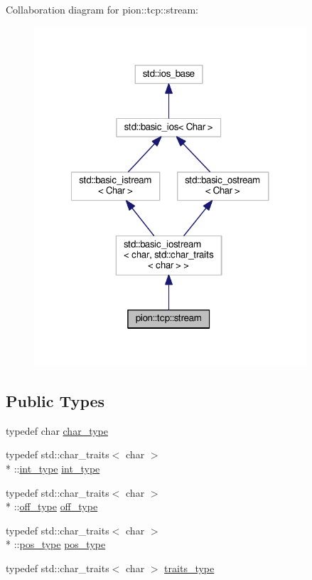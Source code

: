 Collaboration diagram for pion\-:\-:tcp\-:\-:stream\-:
\nopagebreak
\begin{figure}[H]
\begin{center}
\leavevmode
\includegraphics[width=287pt]{classpion_1_1tcp_1_1stream__coll__graph}
\end{center}
\end{figure}
\subsection*{Public Types}
\begin{DoxyCompactItemize}
\item 
typedef char \hyperlink{classpion_1_1tcp_1_1stream_a7a1f84f71957c4d181b3956544bed706}{char\-\_\-type}
\item 
typedef std\-::char\-\_\-traits$<$ char $>$\\*
\-::\hyperlink{classpion_1_1tcp_1_1stream_a226831f2baafb1ad65259fc6c9bb511a}{int\-\_\-type} \hyperlink{classpion_1_1tcp_1_1stream_a226831f2baafb1ad65259fc6c9bb511a}{int\-\_\-type}
\item 
typedef std\-::char\-\_\-traits$<$ char $>$\\*
\-::\hyperlink{classpion_1_1tcp_1_1stream_a035e53a0425f0f05a3c3fd6c9c8be55d}{off\-\_\-type} \hyperlink{classpion_1_1tcp_1_1stream_a035e53a0425f0f05a3c3fd6c9c8be55d}{off\-\_\-type}
\item 
typedef std\-::char\-\_\-traits$<$ char $>$\\*
\-::\hyperlink{classpion_1_1tcp_1_1stream_a9a325595e421119b0e6e6b5972863d98}{pos\-\_\-type} \hyperlink{classpion_1_1tcp_1_1stream_a9a325595e421119b0e6e6b5972863d98}{pos\-\_\-type}
\item 
typedef std\-::char\-\_\-traits$<$ char $>$ \hyperlink{classpion_1_1tcp_1_1stream_a6150c81c258841c753e9246b952193bb}{traits\-\_\-type}
\end{DoxyCompactItemize}
